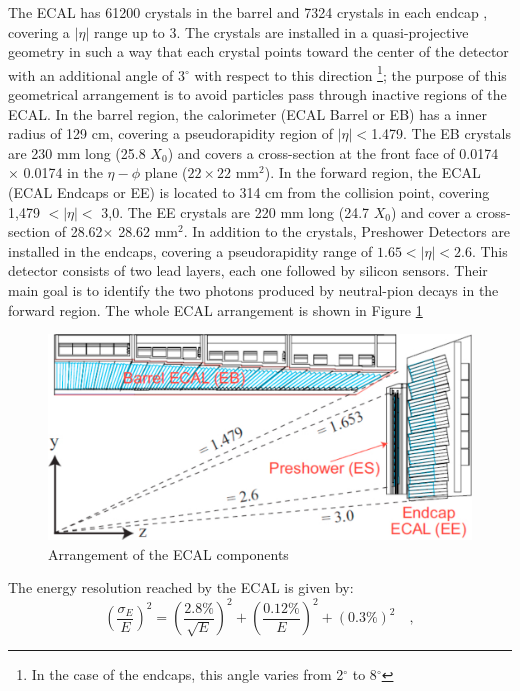 The ECAL has 61200 crystals in the barrel and 7324 crystals in each endcap \cite{CMSTDRcap4}, covering a 
$|\eta|$ range up to 3. The crystals are installed in a quasi-projective geometry 
in such a way that each crystal points toward the center of the detector with an additional angle 
of 3$^{\circ}$ with respect to this direction \footnote{In the case of the endcaps, this angle 
varies from 2$^{\circ}$  to 8$^{\circ}$}; the purpose of this 
geometrical arrangement is to avoid particles pass through inactive regions of the ECAL. In the 
barrel region, the calorimeter (ECAL Barrel or EB) has a inner radius of 129 cm, covering a 
pseudorapidity region of $|\eta| < $1.479. The EB crystals are 230 mm long (25.8 $X_{0}$) and 
covers a cross-section at the front face of 0.0174 $\times$ 0.0174 
in the $\eta-\phi$ plane ($22\times22$ mm$^{2}$). In the forward region,
the ECAL (ECAL Endcaps or EE) is located to 314 cm from the collision point, covering 
1,479 $ < |\eta| < $ 3,0. The EE crystals are 220 mm long (24.7 $X_{0}$) and cover
a cross-section of 28.62$\times$ 28.62 mm$^{2}$. In addition to the crystals, Preshower 
Detectors are installed in the endcaps, covering a pseudorapidity range of  $1.65<|\eta|<2.6$. This detector consists of two 
lead layers, each one followed by silicon sensors. Their main goal is 
to identify the two photons produced by neutral-pion decays 
in the forward region. The whole ECAL arrangement is shown in Figure \ref{figchp2:ECALcrytal}

\begin{center}
\begin{figure}[h]
\centering
\includegraphics[scale=0.35]{figuras/Chapter2/ECAL.pdf}
\caption{Arrangement of the ECAL components}\label{figchp2:ECALcrytal}
\end{figure}
\end{center}

The energy resolution reached by the ECAL is given by:
\begin{equation} \label{ECALenergyResolution}
 \left(\frac{\sigma_{E}}{E}\right)^{2} = \left(\frac{2.8\%}{\sqrt{E}}\right)^{2} + \left(\frac{0.12\%}{E}\right)^{2} + \left(0.3\% \right)^{2}\quad, 
\end{equation}

